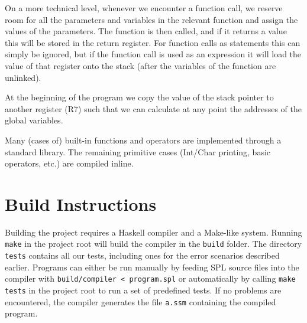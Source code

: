 \documentclass[a4paper]{article}
\begin{document}
On a more technical level, whenever we encounter a function call, we reserve room for all the parameters and variables in the relevant function and assign the values of the parameters.
The function is then called, and if it returns a value this will be stored in the return register.
For function calls as statements this can simply be ignored, but if the function call is used as an expression it will load the value of that register onto the stack (after the variables of the function are unlinked).

At the beginning of the program we copy the value of the stack pointer to another register (R7) such that we can calculate at any point the addresses of the global variables.

Many (cases of) built-in functions and operators are implemented through a standard library.
The remaining primitive cases (Int/Char printing, basic operators, etc.) are compiled inline.

\section{Build Instructions}

Building the project requires a Haskell compiler and a Make-like system.
Running \verb|make| in the project root will build the compiler in the \verb|build| folder.
The directory \verb|tests| contains all our tests, including ones for the error scenarios described earlier.
Programs can either be run manually by feeding SPL source files into the compiler with \verb|build/compiler < program.spl| or automatically by calling \verb|make tests| in the project root to run a set of predefined tests.
If no problems are encountered, the compiler generates the file \verb|a.ssm| containing the compiled program.
\end{document}

